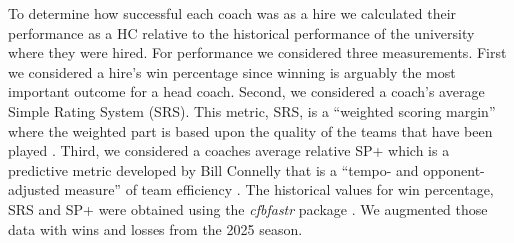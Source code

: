 \documentclass[
  12pt]{article}
\begin{document}
To determine how successful each coach was as a hire we calculated their
performance as a HC relative to the historical performance of the
university where they were hired. For performance we considered three
measurements. First we considered a hire's win percentage since winning
is arguably the most important outcome for a head coach. Second, we
considered a coach's average Simple Rating System (SRS). This metric,
SRS, is a ``weighted scoring margin'' where the weighted part is based
upon the quality of the teams that have been played \citep{intro_srs}.
Third, we considered a coaches average relative SP+ which is a
predictive metric developed by Bill Connelly \citep{intro_sp} that is a
``tempo- and opponent-adjusted measure'' of team efficiency
\citep{sp_2025}. The historical values for win percentage, SRS and SP+
were obtained using the \emph{cfbfastr} package \citep{cfbfastr}. We
augmented those data with wins and losses from the 2025 season.
\end{document}
